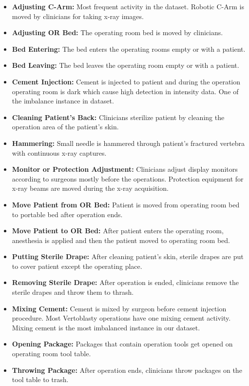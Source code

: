 \begin{itemize}
	\item \textbf{Adjusting C-Arm:} Most frequent activity in the dataset. Robotic C-Arm is moved by clinicians for taking x-ray images.
	\item \textbf{Adjusting OR Bed:} The operating room bed is moved by clinicians. 
	\item \textbf{Bed Entering:} The bed enters the operating rooms empty or with a patient.
	\item \textbf{Bed Leaving:} The bed leaves the operating room empty or with a patient.
	\item \textbf{Cement Injection:} Cement is injected to patient and during the operation operating room is dark which cause high detection in intensity data. One of the imbalance instance in dataset.
	\item \textbf{Cleaning Patient's Back:} Clinicians sterilize patient by cleaning the operation area of the patient's skin.
	\item \textbf{Hammering:} Small needle is hammered through patient's fractured vertebra with continuous x-ray captures.
	\item \textbf{Monitor or Protection Adjustment:} Clinicians adjust display monitors according to surgeons mostly before the operations. Protection equipment for x-ray beams are moved during the x-ray acquisition. 
	\item \textbf{Move Patient from OR Bed:} Patient is moved from operating room bed to portable bed after operation ends.
	\item \textbf{Move Patient to OR Bed:} After patient enters the operating room, anesthesia is applied and then the patient moved to operating room bed.
	\item \textbf{Putting Sterile Drape:} After cleaning patient's skin, sterile drapes are put to cover patient except the operating place.
	\item \textbf{Removing Sterile Drape:} After operation is ended, clinicians remove the sterile drapes and throw them to thrash.
	\item \textbf{Mixing Cement:} Cement is mixed by surgeon before cement injection procedure. Most Vertoblasty operations have one mixing cement activity. Mixing cement is the most imbalanced instance in our dataset.
	\item \textbf{Opening Package:} Packages that contain operation tools get opened on operating room tool table.
	\item \textbf{Throwing Package:} After operation ends, clinicians throw packages on the tool table to trash.
\end{itemize}

